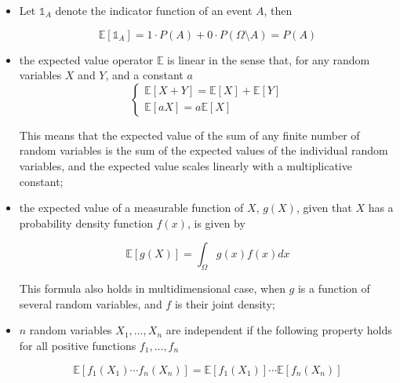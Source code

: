 \begin{itemize}
\tightlist
\item
Let \(\mathbb{1}_{A}\) denote the indicator function of an event
\(A\), then

\begin{equation}
	\mathbb{E}[\mathbb{1}_{A}] = 1\cdot P(A)+0\cdot P(\Omega \setminus A)= P(A)
\end{equation}

\item
the expected value operator \(\mathbb{E}\) is linear in the sense
that, for any random variables \(X\) and \(Y\), and a constant \(a\)
\begin{equation}
\begin{cases}
\mathbb{E}[X+Y] = \mathbb{E}[X] + \mathbb{E}[Y] \\
\mathbb{E}[aX] = a\mathbb{E}[X]
\end{cases}
\end{equation}

This means that the expected value of the sum of any finite number of
random variables is the sum of the expected values of the individual
random variables, and the expected value scales linearly with a
multiplicative constant;

\item
the expected value of a measurable function of \(X\), \(g(X)\), given
that \(X\) has a probability density function \(f(x)\), is given by

\begin{equation}
	\mathbb{E}[g(X)] = \int_{\Omega}g(x)f(x) dx
\end{equation}

This formula also holds in multidimensional case, when \(g\) is a
function of several random variables, and \(f\) is their joint density;

\item
\(n\) random variables \(X_1 ,\ldots , X_n\) are independent if the
following property holds for all positive functions
\(f_1 ,\ldots , f_n\)

\begin{equation}
	\mathbb{E}[f_1 (X_1 )\cdots f_n (X_n )] = \mathbb{E}[f_1 ( X_1 )] \cdots \mathbb{E}[f_n (X_n )]
\end{equation}
\end{itemize}


%


